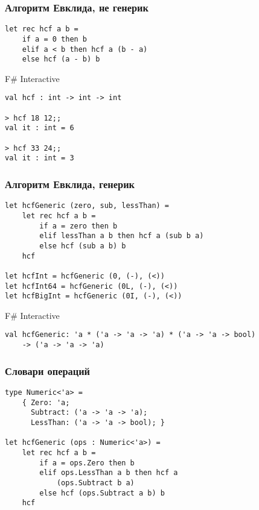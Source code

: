 \documentclass[xetex,mathserif,serif]{beamer}
\begin{document}
    \begin{frame}[fragile]
        \frametitle{Алгоритм Евклида, не генерик}
        \begin{verbatim}
let rec hcf a b =
    if a = 0 then b
    elif a < b then hcf a (b - a)
    else hcf (a - b) b
        \end{verbatim}

        \begin{alertblock}{F\# Interactive}
            \begin{verbatim}
val hcf : int -> int -> int

> hcf 18 12;;
val it : int = 6

> hcf 33 24;;
val it : int = 3
            \end{verbatim}
        \end{alertblock}
    \end{frame}

    \begin{frame}[fragile]
        \frametitle{Алгоритм Евклида, генерик}
        \begin{verbatim}
let hcfGeneric (zero, sub, lessThan) =
    let rec hcf a b =
        if a = zero then b
        elif lessThan a b then hcf a (sub b a)
        else hcf (sub a b) b
    hcf    
    
let hcfInt = hcfGeneric (0, (-), (<))
let hcfInt64 = hcfGeneric (0L, (-), (<))
let hcfBigInt = hcfGeneric (0I, (-), (<))
        \end{verbatim}

        \begin{alertblock}{F\# Interactive}
            \begin{verbatim}
val hcfGeneric: 'a * ('a -> 'a -> 'a) * ('a -> 'a -> bool) 
    -> ('a -> 'a -> 'a)
            \end{verbatim}
        \end{alertblock}
    \end{frame}

    \begin{frame}[fragile]
        \frametitle{Словари операций}
        \begin{verbatim}
type Numeric<'a> =
    { Zero: 'a;
      Subtract: ('a -> 'a -> 'a);
      LessThan: ('a -> 'a -> bool); }

let hcfGeneric (ops : Numeric<'a>) =
    let rec hcf a b =
        if a = ops.Zero then b
        elif ops.LessThan a b then hcf a 
            (ops.Subtract b a)
        else hcf (ops.Subtract a b) b
    hcf
        \end{verbatim}
    \end{frame}
\end{document}
